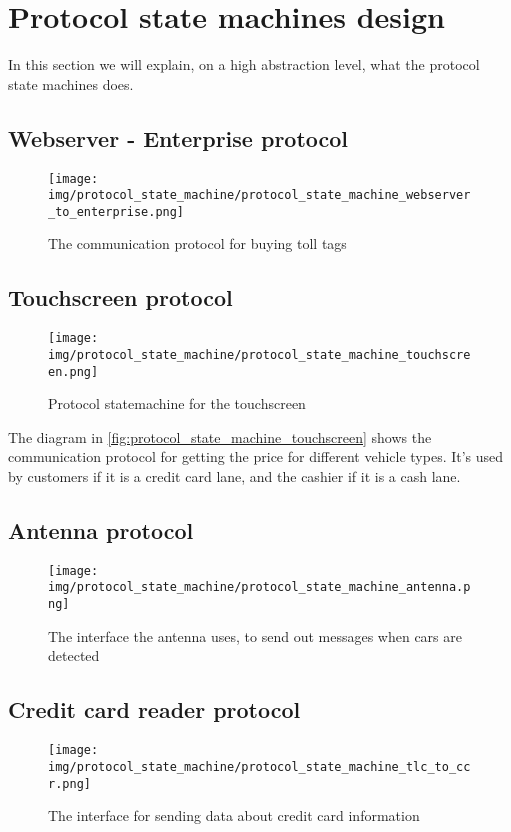\section*{Protocol state machines design}
In this section we will explain, on a high abstraction level, what the protocol state machines does.
\subsection*{Webserver - Enterprise protocol}
\begin{figure}
\centering
\texttt{[image: img/protocol\_state\_machine/protocol\_state\_machine\_webserver\_to\_enterprise.png]}
\caption{The communication protocol for buying toll tags}
\label{fig:protocol_state_machine_webserver_to_enterprise}
\end{figure}

\subsection*{Touchscreen protocol}
\begin{figure}
\centering
\texttt{[image: img/protocol\_state\_machine/protocol\_state\_machine\_touchscreen.png]}
\caption{Protocol statemachine for the touchscreen}
\label{fig:protocol_state_machine_touchscreen}
\end{figure}
The diagram in \autoref{fig:protocol_state_machine_touchscreen} shows the communication protocol for getting the price for different vehicle types. It's used by customers if it is a credit card lane, and the cashier if it is a cash lane.

\subsection*{Antenna protocol}
\begin{figure}
\centering
\texttt{[image: img/protocol\_state\_machine/protocol\_state\_machine\_antenna.png]}
\caption{The interface the antenna uses, to send out messages when cars are detected}
\label{fig:protocol_state_machine_antenna}
\end{figure}

\subsection*{Credit card reader protocol}
\begin{figure}
\centering
\texttt{[image: img/protocol\_state\_machine/protocol\_state\_machine\_tlc\_to\_ccr.png]}
\caption{The interface for sending data about credit card information}
\label{fig:protocol_state_machine_tlc_to_ccr}
\end{figure}

